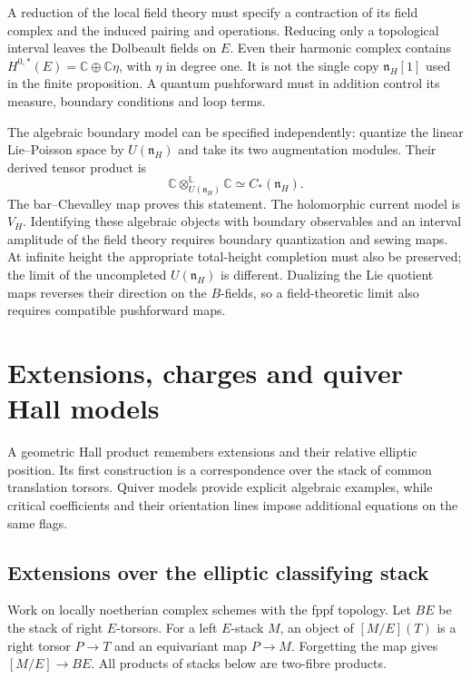 A reduction of the local field theory must specify a contraction of
its field complex and the induced pairing and operations. Reducing
only a topological interval leaves the Dolbeault fields on \(E\).
Even their harmonic complex contains
\(H^{0,*}(E)=\mathbb C\oplus\mathbb C\eta\), with \(\eta\)
in degree one. It is not the single copy \(\mathfrak n_H[1]\)
used in the finite proposition. A quantum pushforward must in
addition control its measure, boundary conditions and loop terms.

The algebraic boundary model can be specified independently:
quantize the linear Lie--Poisson space by \(U(\mathfrak n_H)\)
and take its two augmentation modules. Their derived tensor product is
\[
 \mathbb C\otimes^{\mathbb L}_{U(\mathfrak n_H)}\mathbb C
       \simeq C_*(\mathfrak n_H).
\]
The bar--Chevalley map proves this statement. The holomorphic current
model is \(V_H\). Identifying these algebraic objects with boundary
observables and an interval amplitude of the field theory requires
boundary quantization and sewing maps. At infinite height the
appropriate total-height completion must also be preserved; the
limit of the uncompleted \(U(\mathfrak n_H)\) is different.
Dualizing the Lie quotient maps reverses their direction on the
$B$-fields, so a field-theoretic limit also requires compatible
pushforward maps.

\chapter{Extensions, charges and quiver Hall models}
\label{comp:ch:quiver-models}

A geometric Hall product remembers extensions and their relative
elliptic position. Its first construction is a correspondence over
the stack of common translation torsors. Quiver models provide
explicit algebraic examples, while critical coefficients and their
orientation lines impose additional equations on the same flags.

\section{Extensions over the elliptic classifying stack}
Work on locally noetherian complex schemes with the fppf topology.
Let \(BE\) be the stack of right \(E\)-torsors. For a left
\(E\)-stack \(M\), an object of \([M/E](T)\) is a right
torsor \(P\to T\) and an equivariant map \(P\to M\).
Forgetting the map gives \([M/E]\to BE\). All products of
stacks below are two-fibre products.

